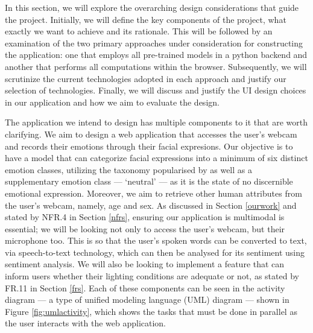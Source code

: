 \documentclass[12pt, a4paper]{article}
\newcommand{\np}
    {
    \vskip 0.4cm
    }
\begin{document}
In this section, we will explore the overarching design considerations that guide the project. Initially, we will define the key components of the project, what exactly we want to achieve and its rationale. This will be followed by an examination of the two primary approaches under consideration for constructing the application: one that employs all pre-trained models in a python backend and another that performs all computations within the browser. Subsequently, we will scrutinize the current technologies adopted in each approach and justify our selection of technologies. Finally, we will discuss and justify the UI design choices in our application and how we aim to evaluate the design.
\np
The application we intend to design has multiple components to it that are worth clarifying. We aim to design a web application that accesses the user's webcam and records their emotions through their facial expresions. Our objective is to have a model that can categorize facial expressions into a minimum of six distinct emotion classes, utilizing the taxonomy popularised by \cite{ekman} as well as a supplementary emotion class --- `neutral' --- as it is the state of no discernible emotional expression. Moreover, we aim to retrieve other human attributes from the user's webcam, namely, age and sex. As discussed in Section \ref{ourwork} and stated by NFR.4 in Section \ref{nfrs}, ensuring our application is multimodal is essential; we will be looking not only to access the user's webcam, but their microphone too. This is so that the user's spoken words can be converted to text, via speech-to-text technology, which can then be analysed for its sentiment using sentiment analysis. We will also be looking to implement a feature that can inform users whether their lighting conditions are adequate or not, as stated by FR.11 in Section \ref{frs}. Each of these components can be seen in the activity diagram --- a type of unified modeling language (UML) diagram --- shown in Figure \ref{fig:umlactivity}, which shows the tasks that must be done in parallel as the user interacts with the web application.
\end{document}

